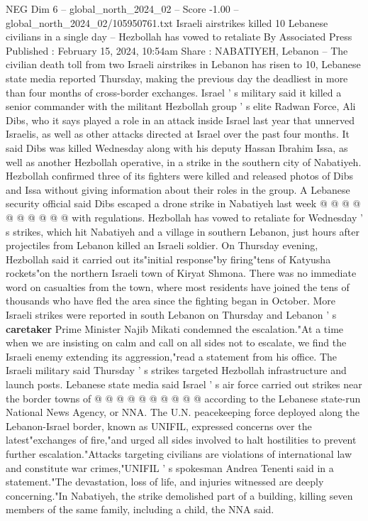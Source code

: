 \begin{textsample}{NEG Dim 6 – global\_north\_2024\_02 – Score -1.00 – global\_north\_2024\_02/105950761.txt}  \label{ex:f6_neg_284}
Israeli airstrikes killed 10 Lebanese civilians in a single day -- Hezbollah has vowed to retaliate By Associated Press Published : February 15, 2024, 10:54am Share : NABATIYEH, Lebanon -- The civilian death toll from two Israeli airstrikes in Lebanon has risen to 10, Lebanese state media reported Thursday, making the previous day the deadliest in more than four months of cross-border exchanges.
Israel ' s military said it killed a senior commander with the militant Hezbollah group ' s elite Radwan Force, Ali Dibs, who it says played a role in an attack inside Israel last year that unnerved Israelis, as well as other attacks directed at Israel over the past four months.
It said Dibs was killed Wednesday along with his deputy Hassan Ibrahim Issa, as well as another Hezbollah operative, in a strike in the southern city of Nabatiyeh.
Hezbollah confirmed three of its fighters were killed and released photos of Dibs and Issa without giving information about their roles in the group.
A Lebanese security official said Dibs escaped a drone strike in Nabatiyeh last week @ @ @ @ @ @ @ @ @ @ with regulations.
Hezbollah has vowed to retaliate for Wednesday ' s strikes, which hit Nabatiyeh and a village in southern Lebanon, just hours after projectiles from Lebanon killed an Israeli soldier.
On Thursday evening, Hezbollah said it carried out its"initial response"by firing"tens of Katyusha rockets"on the northern Israeli town of Kiryat Shmona.
There was no immediate word on casualties from the town, where most residents have joined the tens of thousands who have fled the area since the fighting began in October.
More Israeli strikes were reported in south Lebanon on Thursday and Lebanon ' s \textbf{caretaker} Prime Minister Najib Mikati condemned the escalation."At a time when we are insisting on calm and call on all sides not to escalate, we find the Israeli enemy extending its aggression,"read a statement from his office.
The Israeli military said Thursday ' s strikes targeted Hezbollah infrastructure and launch posts.
Lebanese state media said Israel ' s air force carried out strikes near the border towns of @ @ @ @ @ @ @ @ @ @ according to the Lebanese state-run National News Agency, or NNA.
The U.N. peacekeeping force deployed along the Lebanon-Israel border, known as UNIFIL, expressed concerns over the latest"exchanges of fire,"and urged all sides involved to halt hostilities to prevent further escalation."Attacks targeting civilians are violations of international law and constitute war crimes,"UNIFIL ' s spokesman Andrea Tenenti said in a statement."The devastation, loss of life, and injuries witnessed are deeply concerning."In Nabatiyeh, the strike demolished part of a building, killing seven members of the same family, including a child, the NNA said.

\end{textsample}

